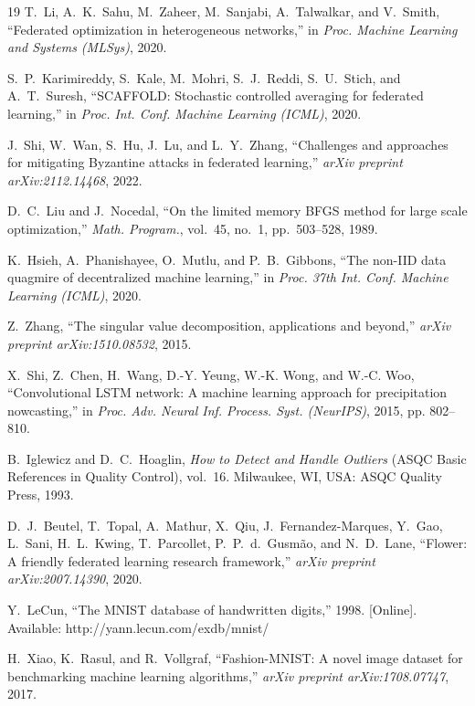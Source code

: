 \documentclass[journal]{IEEEtran}
\begin{document}
\begin{thebibliography}{19}
T.~Li, A.~K.~Sahu, M.~Zaheer, M.~Sanjabi, A.~Talwalkar, and V.~Smith, ``Federated optimization in heterogeneous networks,'' in \textit{Proc. Machine Learning and Systems (MLSys)}, 2020.

S.~P.~Karimireddy, S.~Kale, M.~Mohri, S.~J.~Reddi, S.~U.~Stich, and A.~T.~Suresh, ``SCAFFOLD: Stochastic controlled averaging for federated learning,'' in \textit{Proc. Int. Conf. Machine Learning (ICML)}, 2020.

J.~Shi, W.~Wan, S.~Hu, J.~Lu, and L.~Y.~Zhang, ``Challenges and approaches for mitigating Byzantine attacks in federated learning,'' \textit{arXiv preprint arXiv:2112.14468}, 2022.

D.~C.~Liu and J.~Nocedal, ``On the limited memory BFGS method for large scale optimization,'' \textit{Math. Program.}, vol.~45, no.~1, pp.~503--528, 1989.

K.~Hsieh, A.~Phanishayee, O.~Mutlu, and P.~B.~Gibbons, ``The non-IID data quagmire of decentralized machine learning,'' in \textit{Proc. 37th Int. Conf. Machine Learning (ICML)}, 2020.

Z.~Zhang, ``The singular value decomposition, applications and beyond,'' \textit{arXiv preprint arXiv:1510.08532}, 2015.

X.~Shi, Z.~Chen, H.~Wang, D.-Y. Yeung, W.-K. Wong, and W.-C. Woo, ``Convolutional LSTM network: A machine learning approach for precipitation nowcasting,'' in \textit{Proc. Adv. Neural Inf. Process. Syst. (NeurIPS)}, 2015, pp. 802--810.

B.~Iglewicz and D.~C.~Hoaglin, \textit{How to Detect and Handle Outliers} (ASQC Basic References in Quality Control), vol.~16.\hskip 1sp Milwaukee, WI, USA: ASQC Quality Press, 1993.

D.~J.~Beutel, T.~Topal, A.~Mathur, X.~Qiu, J.~Fernandez-Marques, Y.~Gao, L.~Sani, H.~L.~Kwing, T.~Parcollet, P.~P.~d.~Gusm\~{a}o, and N.~D.~Lane, ``Flower: A friendly federated learning research framework,'' \textit{arXiv preprint arXiv:2007.14390}, 2020.

Y.~LeCun, ``The MNIST database of handwritten digits,'' 1998. [Online]. Available: http://yann.lecun.com/exdb/mnist/

H.~Xiao, K.~Rasul, and R.~Vollgraf, ``Fashion-MNIST: A novel image dataset for benchmarking machine learning algorithms,'' \textit{arXiv preprint arXiv:1708.07747}, 2017.

\end{thebibliography}
\end{document}
